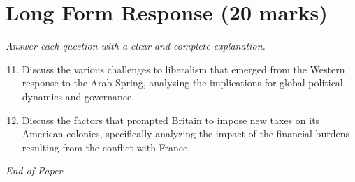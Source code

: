 \documentclass[12pt]{article}
\begin{document}
\section*{Long Form Response (20 marks)}
\textit{Answer each question with a clear and complete explanation.}
\begin{enumerate}[label=\arabic*.]
\setcounter{enumi}{10}
\item Discuss the various challenges to liberalism that emerged from the Western response to the Arab Spring, analyzing the implications for global political dynamics and governance.
\item Discuss the factors that prompted Britain to impose new taxes on its American colonies, specifically analyzing the impact of the financial burdens resulting from the conflict with France.
\end{enumerate}

\vfill
\noindent\textit{End of Paper}
\end{document}
